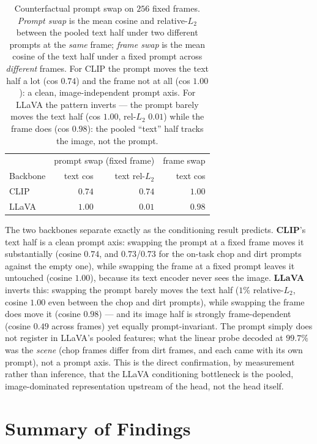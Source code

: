 \begin{table}[ht]
\centering
\begin{tabular}{lrrr}
\hline
 & \multicolumn{2}{c}{prompt swap (fixed frame)} & frame swap \\
Backbone & text cos & text rel-$L_2$ & text cos \\
\hline
CLIP  & $0.74$ & $0.74$ & $1.00$ \\
LLaVA & $1.00$ & $0.01$ & $0.98$ \\
\hline
\end{tabular}
\caption{Counterfactual prompt swap on $256$ fixed frames. \emph{Prompt swap} is
the mean cosine and relative-$L_2$ between the pooled text half under two
different prompts at the \emph{same} frame; \emph{frame swap} is the mean cosine
of the text half under a fixed prompt across \emph{different} frames. For CLIP the
prompt moves the text half a lot (cos $0.74$) and the frame not at all (cos
$1.00$): a clean, image-independent prompt axis. For LLaVA the pattern inverts ---
the prompt barely moves the text half (cos $1.00$, rel-$L_2$ $0.01$) while the
frame does (cos $0.98$): the pooled \enquote{text} half tracks the image, not the
prompt.}
\label{tab:swap}
\end{table}

The two backbones separate exactly as the conditioning result predicts.
\textbf{CLIP}'s text half is a clean prompt axis: swapping the prompt at a fixed
frame moves it substantially (cosine $0.74$, and $0.73$/$0.73$ for the on-task
chop and dirt prompts against the empty one), while swapping the frame at a fixed
prompt leaves it untouched (cosine $1.00$), because its text encoder never sees
the image. \textbf{LLaVA} inverts this: swapping the prompt barely moves the text
half ($1\%$ relative-$L_2$, cosine $1.00$ even between the chop and dirt prompts),
while swapping the frame does move it (cosine $0.98$) --- and its image half is
strongly frame-dependent (cosine $0.49$ across frames) yet equally
prompt-invariant. The prompt simply does not register in LLaVA's pooled features;
what the linear probe decoded at $99.7\%$ was the \emph{scene} (chop frames differ
from dirt frames, and each came with its own prompt), not a prompt axis. This is
the direct confirmation, by measurement rather than inference, that the LLaVA
conditioning bottleneck is the pooled, image-dominated representation upstream of
the head, not the head itself.

\section{Summary of Findings}
\label{sec:exp-summary}

